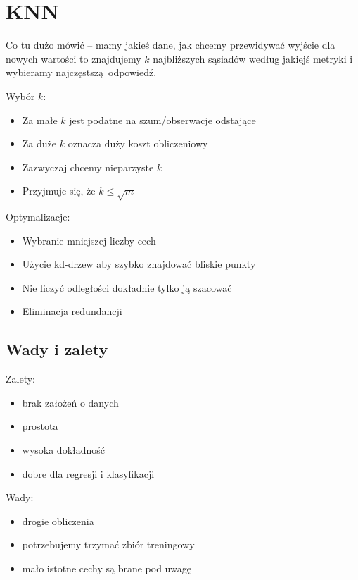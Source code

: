 \section{KNN}

Co tu dużo mówić -- mamy jakieś dane, jak chcemy przewidywać wyjście dla nowych wartości to znajdujemy \( k \) najbliższych sąsiadów według jakiejś metryki i wybieramy najczęstszą odpowiedź.

Wybór \( k \):
\begin{itemize}
	\item Za małe \( k \) jest podatne na szum/obserwacje odstające
	\item Za duże \( k \) oznacza duży koszt obliczeniowy
	\item Zazwyczaj chcemy nieparzyste \( k \)
	\item Przyjmuje się, że \( k \leq \sqrt{m} \)
\end{itemize}

Optymalizacje:
\begin{itemize}
	\item Wybranie mniejszej liczby cech
	\item Użycie kd-drzew aby szybko znajdować bliskie punkty
	\item Nie liczyć odległości dokładnie tylko ją szacować
	\item Eliminacja redundancji
\end{itemize}

\subsection{Wady i zalety}

Zalety:
\begin{itemize}
	\item brak założeń o danych
	\item prostota
	\item wysoka dokładność
	\item dobre dla regresji i klasyfikacji
\end{itemize}

Wady:
\begin{itemize}
	\item drogie obliczenia
	\item potrzebujemy trzymać zbiór treningowy
	\item mało istotne cechy są brane pod uwagę
\end{itemize}